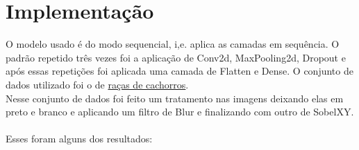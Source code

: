 \documentclass{article}
\begin{document}
\section{Implementação}
O modelo usado é do modo sequencial, i,e. aplica as camadas em sequência. O padrão repetido três vezes foi a aplicação de Conv2d, MaxPooling2d, Dropout e após essas repetições foi aplicada uma camada de Flatten e Dense. O conjunto de dados utilizado foi o de \href{https://www.kaggle.com/competitions/dog-breed-identification/data}{raças de cachorros}.\\
Nesse conjunto de dados foi feito um tratamento nas imagens deixando elas em preto e branco e aplicando um filtro de Blur e finalizando com outro de SobelXY.\\\\
Esses foram alguns dos resultados:\\\\
\end{document}
